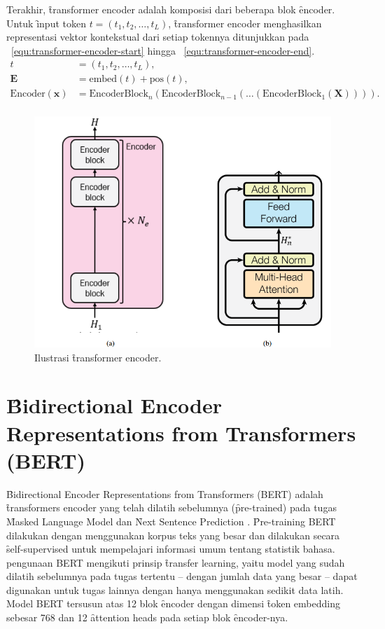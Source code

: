 	Terakhir, \f{transformer encoder} adalah komposisi dari beberapa blok \f{encoder}. Untuk \f{input} token $t=(t_1, t_2, \dots, t_L)$, \f{transformer encoder} menghasilkan representasi vektor kontekstual dari setiap tokennya ditunjukkan pada \equ~\ref{equ:transformer-encoder-start} hingga \equ~\ref{equ:transformer-encoder-end}.
	\begin{align}
		\label{equ:transformer-encoder-start} 
		t &= (t_1, t_2, \dots, t_L), \\
		\mathbf{E} &= \text{embed}(t)+ \text{pos}(t), \\
		\label{equ:transformer-encoder-end}
		\text{Encoder}(\mathbf{x}) &= \text{EncoderBlock}_n(\text{EncoderBlock}_{n-1}(\dots(\text{EncoderBlock}_1(\mathbf{X})))). \\
	\end{align}
	\begin{figure}
		\centering
		\includegraphics[width=1\textwidth]{assets/pics/final-transformers-encoder.png}
		\caption{Ilustrasi \f{transformer encoder}.}
		\label{fig:transformer-encoder}
	\end{figure}

\section{\f{Bidirectional Encoder Representations from Transformers} (BERT)}
\f{Bidirectional Encoder Representations from Transformers} (BERT) adalah \f{transformers encoder} yang telah dilatih sebelumnya (\f{pre-trained}) pada tugas \f{Masked Language Model} dan \f{Next Sentence Prediction} \citep{bertori}. \f{Pre-training} BERT dilakukan dengan menggunakan korpus teks yang besar dan dilakukan secara \f{self-supervised} untuk mempelajari informasi umum tentang statistik bahasa.
pengunaan BERT mengikuti prinsip \f{transfer learning}, yaitu model yang sudah dilatih sebelumnya pada tugas tertentu -- dengan jumlah data yang besar -- dapat digunakan untuk tugas lainnya dengan hanya menggunakan sedikit data latih. Model BERT tersusun atas 12 blok \f{encoder} dengan dimensi \f{token embedding} sebesar 768 dan 12 \f{attention heads} pada setiap blok \f{encoder}-nya.

